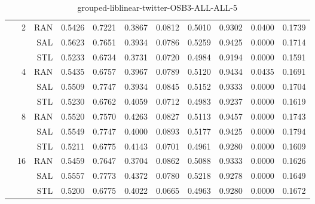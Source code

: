 \begin{center}
\begin{table}[htbp]
\begin{tabular}{ | r | r | r | r | r | r | r | r | r | r | r |}
 & \multirow{3}{*}{2} & RAN & 0.5426 & 0.7221 & 0.3867 & 0.0812 & 0.5010 & 0.9302 & 0.0400 & 0.1739\\ \cline{3-11}
 &   & SAL & 0.5623 & 0.7651 & 0.3934 & 0.0786 & 0.5259 & 0.9425 & 0.0000 & 0.1714\\ \cline{3-11}
 &   & STL & 0.5233 & 0.6734 & 0.3731 & 0.0720 & 0.4984 & 0.9194 & 0.0000 & 0.1591\\ \cline{2-11}
 & \multirow{3}{*}{4} & RAN & 0.5435 & 0.6757 & 0.3967 & 0.0789 & 0.5120 & 0.9434 & 0.0435 & 0.1691\\ \cline{3-11}
 &   & SAL & 0.5509 & 0.7747 & 0.3934 & 0.0845 & 0.5152 & 0.9333 & 0.0000 & 0.1704\\ \cline{3-11}
 &   & STL & 0.5230 & 0.6762 & 0.4059 & 0.0712 & 0.4983 & 0.9237 & 0.0000 & 0.1619\\ \cline{2-11}
 & \multirow{3}{*}{8} & RAN & 0.5520 & 0.7570 & 0.4263 & 0.0827 & 0.5113 & 0.9457 & 0.0000 & 0.1743\\ \cline{3-11}
 &   & SAL & 0.5549 & 0.7747 & 0.4000 & 0.0893 & 0.5177 & 0.9425 & 0.0000 & 0.1794\\ \cline{3-11}
 &   & STL & 0.5211 & 0.6775 & 0.4143 & 0.0701 & 0.4961 & 0.9280 & 0.0000 & 0.1609\\ \cline{2-11}
 & \multirow{3}{*}{16} & RAN & 0.5459 & 0.7647 & 0.3704 & 0.0862 & 0.5088 & 0.9333 & 0.0000 & 0.1626\\ \cline{3-11}
 &   & SAL & 0.5557 & 0.7773 & 0.4372 & 0.0780 & 0.5218 & 0.9278 & 0.0000 & 0.1649\\ \cline{3-11}
 &   & STL & 0.5200 & 0.6775 & 0.4022 & 0.0665 & 0.4963 & 0.9280 & 0.0000 & 0.1672\\ \cline{2-11}
\hline
\end{tabular}
\caption{grouped-liblinear-twitter-OSB3-ALL-ALL-5}
\end{table}
\end{center}

